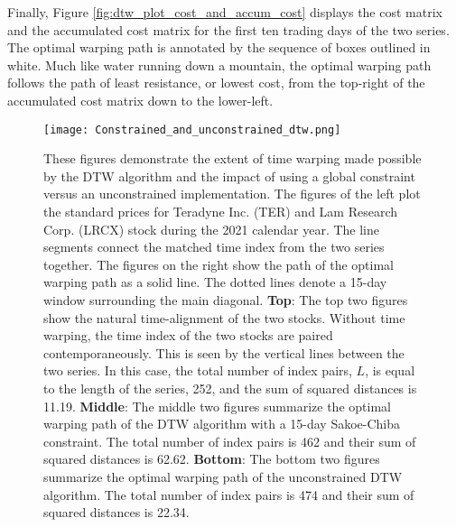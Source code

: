 \documentclass[12pt]{report}
\begin{document}
Finally, Figure \ref{fig:dtw_plot_cost_and_accum_cost} displays the cost matrix and the accumulated cost matrix for the first ten trading days of the two series. The optimal warping path is annotated by the sequence of boxes outlined in white. Much like water running down a mountain, the optimal warping path follows the path of least resistance, or lowest cost, from the top-right of the accumulated cost matrix down to the lower-left.



\begin{figure}
    \centering
    \texttt{[image: Constrained\_and\_unconstrained\_dtw.png]}
    \caption{These figures demonstrate the extent of time warping made possible by the DTW algorithm and the impact of using a global constraint versus an unconstrained implementation. The figures of the left plot the standard prices for Teradyne Inc. (TER) and Lam Research Corp. (LRCX) stock during the 2021 calendar year. The line segments connect the matched time index from the two series together. The figures on the right show the path of the optimal warping path as a solid line. The dotted lines denote a 15-day window surrounding the main diagonal. \textbf{Top}: The top two figures show the natural time-alignment of the two stocks. Without time warping, the time index of the two stocks are paired contemporaneously. This is seen by the vertical lines between the two series. In this case, the total number of index pairs, $L$, is equal to the length of the series, 252, and the sum of squared distances is 11.19. \textbf{Middle}: The middle two figures summarize the optimal warping path of the DTW algorithm with a 15-day Sakoe-Chiba constraint. The total number of index pairs is 462 and their sum of squared distances is 62.62. \textbf{Bottom}: The bottom two figures summarize the optimal warping path of the unconstrained DTW algorithm. The total number of index pairs is 474 and their sum of squared distances is 22.34.}
    \label{fig:constrained_and_unconstrained_dtw}
\end{figure}
\end{document}

